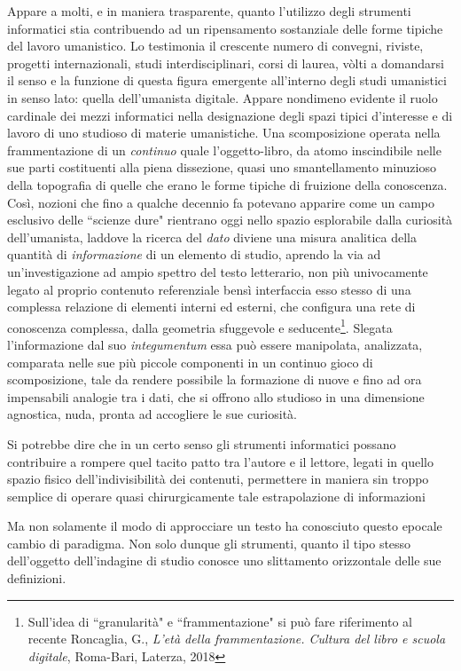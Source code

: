 \documentclass[
  b5paper,
  twoside,
  12pt,
  chapterprefix=false,
  bibliography=totocnumbered,
  parskip=false]{scrbook}
\begin{document}
Appare a molti, e in maniera trasparente, quanto l'utilizzo degli strumenti informatici stia contribuendo ad un ripensamento sostanziale delle forme tipiche del lavoro umanistico. Lo testimonia il crescente numero di convegni, riviste, progetti internazionali, studi interdisciplinari, corsi di laurea, vòlti a domandarsi il senso e la funzione di questa figura emergente all'interno degli studi umanistici in senso lato: quella dell'umanista digitale.
Appare nondimeno evidente il ruolo cardinale dei mezzi informatici nella designazione degli spazi tipici d'interesse e di lavoro di uno studioso di materie umanistiche. Una scomposizione operata nella frammentazione di un \emph{continuo} quale l'oggetto-libro, da atomo inscindibile nelle sue parti costituenti alla piena dissezione, quasi uno smantellamento minuzioso della topografia di quelle che erano le forme tipiche di fruizione della conoscenza.
Così, nozioni che fino a qualche decennio fa potevano apparire come un campo esclusivo delle ``scienze dure" rientrano oggi nello spazio esplorabile dalla curiosità dell'umanista, laddove la ricerca del \emph{dato} diviene una misura analitica della quantità di \emph{informazione} di un elemento di studio, aprendo la via ad un'investigazione ad ampio spettro del testo letterario, non più univocamente legato al proprio contenuto referenziale bensì interfaccia esso stesso di una complessa relazione di elementi interni ed esterni, che configura una rete di conoscenza complessa, dalla geometria sfuggevole e seducente\footnote{Sull'idea di ``granularità" e ``frammentazione" si può fare riferimento al recente Roncaglia, G., \emph{L'età della frammentazione. Cultura del libro e scuola digitale}, Roma-Bari, Laterza, 2018}.
Slegata l'informazione dal suo \emph{integumentum} essa può essere manipolata, analizzata, comparata nelle sue più piccole componenti in un continuo gioco di scomposizione, tale da rendere possibile la formazione di nuove e fino ad ora impensabili analogie tra i dati, che si offrono allo studioso in una dimensione agnostica, nuda, pronta ad accogliere le sue curiosità.

Si potrebbe dire che in un certo senso gli strumenti informatici possano contribuire a rompere quel tacito patto tra l'autore e il lettore, legati in quello spazio fisico dell'indivisibilità dei contenuti, permettere in maniera sin troppo semplice di operare quasi chirurgicamente tale estrapolazione di informazioni

Ma non solamente il modo di approcciare un testo ha conosciuto questo epocale cambio di paradigma. Non solo dunque gli strumenti, quanto il tipo stesso dell'oggetto dell'indagine di studio conosce uno slittamento orizzontale delle sue definizioni.
\end{document}
